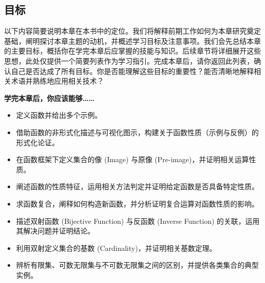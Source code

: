 
\subsection{目标}

以下内容简要说明本章在本书中的定位。我们将解释前期工作如何为本章研究奠定基础，阐明探讨本章主题的动机，并概述学习目标及注意事项。我们会先总结本章的主要目标，概括你在学完本章后应掌握的技能与知识。后续章节将详细展开这些思想，此处仅提供一个简要列表作为学习指引。完成本章后，请你返回此列表，确认自己是否达成了所有目标。你是否能理解这些目标的重要性？能否清晰地解释相关术语并熟练地应用相关技术？

\textbf{学完本章后，你应该能够……}

\begin{itemize}
    \item 定义函数并给出多个示例。
    \item 借助函数的非形式化描述与可视化图示，构建关于函数性质（示例与反例）的形式化论证。
    \item 在函数框架下定义集合的像 (Image) 与原像 (Pre-image)，并证明相关运算性质。
    \item 阐述函数的性质特征，运用相关方法判定并证明给定函数是否具备特定性质。
    \item 求函数复合，阐释如何构造新函数，并分析证明复合运算对函数性质的影响。
    \item 描述双射函数 (Bijective Function) 与反函数 (Inverse Function) 的关联，运用其解决问题并证明结论。
    \item 利用双射定义集合的基数 (Cardinality)，并证明相关基数定理。
    \item 辨析有限集、可数无限集与不可数无限集之间的区别，并提供各类集合的典型实例。
\end{itemize}